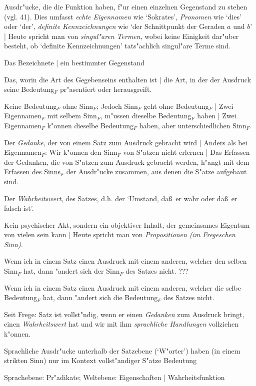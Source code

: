 \documentclass[]{scrartcl}
\begin{document}
\begin{description}[leftmargin=!,labelwidth=\widthof{\bfseries 2}]
  \item[Eigenname$_{F}$] Ausdr"ucke, die die Funktion haben, f"ur einen einzelnen Gegenstand zu stehen (vgl. 41). Dies umfasst \emph{echte Eigennamen} wie `Sokrates', \emph{Pronomen} wie `dies' oder `der', \emph{definite Kennzeichnungen} wie `der Schnittpunkt der Geraden $a$ und $b$' | Heute spricht man von \emph{singul"aren Termen}, wobei keine Einigkeit dar"uber besteht, ob `definite Kennzeichnungen' tats"achlich singul"are Terme sind.
  \item[Bedeutung$_{F}$ eines Eigennamen$_{F}$] Das Bezeichnete | ein bestimmter Gegenstand
  \item[Sinn$_{F}$ eines Eigennamen$_{F}$] Das, worin die Art des Gegebenseins enthalten ist | die Art, in der der Ausdruck seine Bedeutung$_{F}$ pr"asentiert oder herausgreift.
  \item[Beziehung Sinn$_{F}$ - Bedeutung$_{F}$] Keine Bedeutung$_{F}$ ohne Sinn$_{F}$; Jedoch Sinn$_{F}$ geht ohne Bedeutung$_{F}$ | Zwei Eigennamen$_{F}$ mit selbem Sinn$_{F}$, m"ussen dieselbe Bedeutung$_{F}$ haben | Zwei Eigennamen$_{F}$ k"onnen dieselbe Bedeutung$_{F}$ haben, aber unterschiedlichen Sinn$_{F}$.
  \item[Sinn$_{F}$ eines Satzes] Der \emph{Gedanke}, der von einem Satz zum Ausdruck gebracht wird | Anders als bei Eigennamen$_{F}$: Wir k"onnen den Sinn$_{F}$ von S"atzen nicht erlernen | Das Erfassen der Gedanken, die von S"atzen zum Ausdruck gebracht werden, h"angt mit dem Erfassen des Sinns$_{F}$ der Ausdr"ucke zusammen, aus denen die S"atze aufgebaut sind.
  \item[Bedeutung$_{F}$ eines Satzes] Der \emph{Wahrheitswert},  des Satzes, d.h. der `Umstand, da\ss~er wahr oder da\ss~er falsch ist'.
  \item[Gedanke] Kein psychischer Akt, sondern ein objektiver Inhalt, der gemeinsames Eigentum von vielen sein kann | Heute spricht man von \emph{Propositionen (im Fregeschen Sinn)}. 
  \item[Kompositionalit"at des Sinns$_{F}$] Wenn ich in einem Satz einen Ausdruck mit einem anderen, welcher den selben Sinn$_{F}$ hat, dann "andert sich der Sinn$_{F}$ des Satzes nicht. {\color{red}???}
  \item[Kompositionalit"at der Bedeutung$_{F}$] Wenn ich in einem Satz einen Ausdruck mit einem anderen, welcher die selbe Bedeutung$_{F}$ hat, dann "andert sich die Bedeutung$_{F}$ des Satzes nicht.
  \item[Satz] Seit Frege: Satz ist vollst"ndig, wenn er einen \emph{Gedanken} zum Ausdruck bringt, einen \emph{Wahrheitswert} hat und wir mit ihm \emph{sprachliche Handlungen} vollziehen k"onnen.
  \item[Kontextprinzip] Sprachliche Ausdr"ucke unterhalb der Satzebene (`W"orter') haben (in einem strikten Sinn) nur im Kontext vollst"andiger S"atze Bedeutung
    \item[Pr"adikat] Sprachebene: Pr"adikate; Weltebene: Eigenschaften | Wahrheitsfunktion
\end{description}
\end{document}

